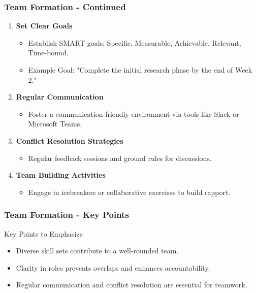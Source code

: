 \documentclass[aspectratio=169]{beamer}
\begin{document}
\begin{frame}[fragile]
    \frametitle{Team Formation - Continued}
    \begin{enumerate}[resume]
        \item \textbf{Set Clear Goals}
        \begin{itemize}
            \item Establish SMART goals: Specific, Measurable, Achievable, Relevant, Time-bound.
            \item Example Goal: "Complete the initial research phase by the end of Week 2."
        \end{itemize}
        
        \item \textbf{Regular Communication}
        \begin{itemize}
            \item Foster a communication-friendly environment via tools like Slack or Microsoft Teams.
        \end{itemize}
        
        \item \textbf{Conflict Resolution Strategies}
        \begin{itemize}
            \item Regular feedback sessions and ground rules for discussions.
        \end{itemize}
        
        \item \textbf{Team Building Activities}
        \begin{itemize}
            \item Engage in icebreakers or collaborative exercises to build rapport.
        \end{itemize}
    \end{enumerate}
\end{frame}

\begin{frame}[fragile]
    \frametitle{Team Formation - Key Points}
    \begin{block}{Key Points to Emphasize}
        \begin{itemize}
            \item Diverse skill sets contribute to a well-rounded team.
            \item Clarity in roles prevents overlaps and enhances accountability.
            \item Regular communication and conflict resolution are essential for teamwork.
        \end{itemize}
    \end{block}
\end{frame}
\end{document}
